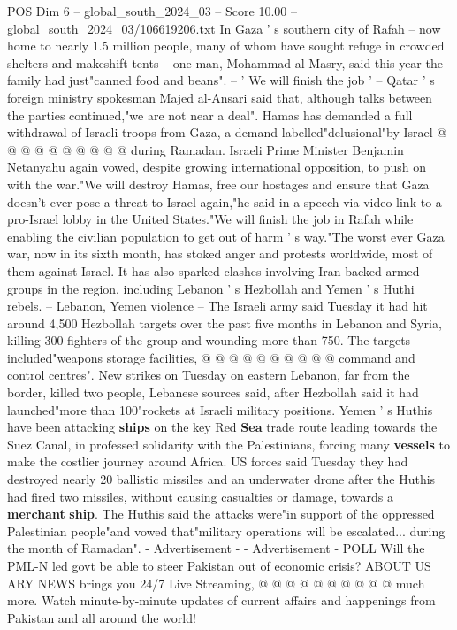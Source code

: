 \begin{textsample}{POS Dim 6 – global\_south\_2024\_03 – Score 10.00 – global\_south\_2024\_03/106619206.txt}
In Gaza ' s southern city of Rafah -- now home to nearly 1.5 million people, many of whom have sought refuge in crowded shelters and makeshift tents -- one man, Mohammad al-Masry, said this year the family had just"canned food and beans". -- ' We will finish the job ' -- Qatar ' s foreign ministry spokesman Majed al-Ansari said that, although talks between the parties continued,"we are not near a deal".
Hamas has demanded a full withdrawal of Israeli troops from Gaza, a demand labelled"delusional"by Israel @ @ @ @ @ @ @ @ @ @ during Ramadan.
Israeli Prime Minister Benjamin Netanyahu again vowed, despite growing international opposition, to push on with the war."We will destroy Hamas, free our hostages and ensure that Gaza doesn't ever pose a threat to Israel again,"he said in a speech via video link to a pro-Israel lobby in the United States."We will finish the job in Rafah while enabling the civilian population to get out of harm ' s way."The worst ever Gaza war, now in its sixth month, has stoked anger and protests worldwide, most of them against Israel.
It has also sparked clashes involving Iran-backed armed groups in the region, including Lebanon ' s Hezbollah and Yemen ' s Huthi rebels. -- Lebanon, Yemen violence -- The Israeli army said Tuesday it had hit around 4,500 Hezbollah targets over the past five months in Lebanon and Syria, killing 300 fighters of the group and wounding more than 750.
The targets included"weapons storage facilities, @ @ @ @ @ @ @ @ @ @ command and control centres".
New strikes on Tuesday on eastern Lebanon, far from the border, killed two people, Lebanese sources said, after Hezbollah said it had launched"more than 100"rockets at Israeli military positions.
Yemen ' s Huthis have been attacking \textbf{ships} on the key Red \textbf{Sea} trade route leading towards the Suez Canal, in professed solidarity with the Palestinians, forcing many \textbf{vessels} to make the costlier journey around Africa.
US forces said Tuesday they had destroyed nearly 20 ballistic missiles and an underwater drone after the Huthis had fired two missiles, without causing casualties or damage, towards a \textbf{merchant} \textbf{ship}.
The Huthis said the attacks were"in support of the oppressed Palestinian people"and vowed that"military operations will be escalated... during the month of Ramadan". - Advertisement - - Advertisement - POLL Will the PML-N led govt be able to steer Pakistan out of economic crisis?
ABOUT US ARY NEWS brings you 24/7 Live Streaming, @ @ @ @ @ @ @ @ @ @ much more.
Watch minute-by-minute updates of current affairs and happenings from Pakistan and all around the world!

\end{textsample}
